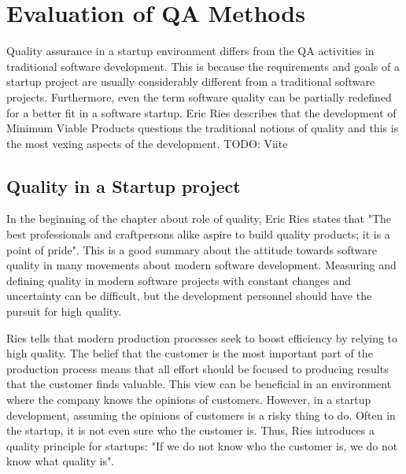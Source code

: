 


 \section{Evaluation of QA Methods}

Quality assurance in a startup environment differs from the QA activities in traditional software development. This is because the requirements and goals of a startup project are usually considerably different from a traditional software projects. Furthermore, even the term software quality can be partially redefined for a better fit in a software startup. Eric Ries describes that the development of Minimum Viable Products questions the traditional notions of quality and this is the most vexing aspects of the development. TODO: Viite

 \subsection{Quality in a Startup project}

In the beginning of the chapter about role of quality, Eric Ries states that "The best professionals and craftpersons alike aspire to build quality products; it is a point of pride". This is a good summary about the attitude towards software quality in many movements about modern software development. Measuring and defining quality in modern software projects with constant changes and uncertainty can be difficult, but the development personnel should have the pursuit for high quality.

Ries tells that modern production processes seek to boost efficiency by relying to high quality. The belief that the customer is the most important part of the production process means that all effort should be focused to producing results that the customer finds valuable. This view can be beneficial in an environment where the company knows the opinions of customers. However, in a startup development, assuming the opinions of customers is a risky thing to do. Often in the startup, it is not even sure who the customer is. Thus, Ries introduces a quality principle for startups: "If we do not know who the customer is, we do not know what quality is".

